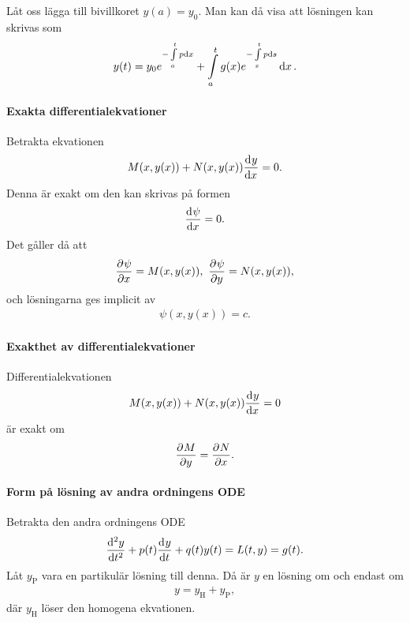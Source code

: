 Låt oss lägga till bivillkoret $y(a) = y_0$. Man kan då visa att lösningen kan skrivas som
\begin{align*}
	y(t) = y_0e^{-\int\limits_{a}^{t}p\dd{x}} + \int\limits_{a}^{t}g(x)e^{-\int\limits_{x}^{t}p\dd{s}}\dd{x}.
\end{align*}

\paragraph{Exakta differentialekvationer}
Betrakta ekvationen
\begin{align*}
	M(x, y(x)) + N(x, y(x))\dv[]{y}{x} (x) = 0.
\end{align*}
Denna är exakt om den kan skrivas på formen
\begin{align*}
	\dv[]{\psi}{x} (x, y(x)) = 0.
\end{align*}
Det gåller då att
\begin{align*}
	\pdv[]{\psi}{x} (x, y(x)) = M(x, y(x)),\ \pdv[]{\psi}{y} (x, y(x)) = N(x, y(x)),
\end{align*}
och lösningarna ges implicit av
\begin{align*}
	\psi(x, y(x)) = c.
\end{align*}

\paragraph{Exakthet av differentialekvationer}
Differentialekvationen
\begin{align*}
	M(x, y(x)) + N(x, y(x))\dv[]{y}{x} (x) = 0
\end{align*}
är exakt om
\begin{align*}
	\pdv[]{M}{y} (x, y(x)) = \pdv[]{N}{x} (x, y(x)).
\end{align*}

\paragraph{Form på lösning av andra ordningens ODE}
Betrakta den andra ordningens ODE
\begin{align*}
	\dv[2]{y}{t} (t) + p(t)\dv[]{y}{t} (t) + q(t)y(t) = L(t, y) = g(t).
\end{align*}
Låt $y_{\text{P}}$ vara en partikulär lösning till denna. Då är $y$ en lösning om och endast om
\begin{align*}
	y = y_{\text{H}} + y_{\text{P}},
\end{align*}
där $y_{\text{H}}$ löser den homogena ekvationen.

